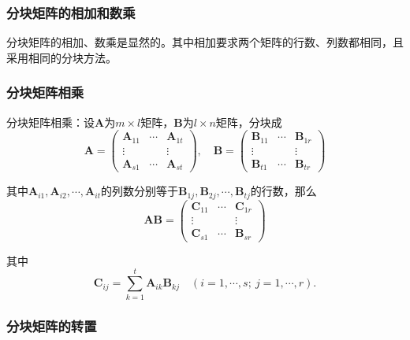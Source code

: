 \documentclass[12pt, a4paper, oneside]{ctexart}
\begin{document}
\subsubsection{分块矩阵的相加和数乘}

分块矩阵的相加、数乘是显然的。其中相加要求两个矩阵的行数、列数都相同，且采用相同的分块方法。

\subsubsection{分块矩阵相乘}

分块矩阵相乘：设$\mathbf{A}$为$m\times l$矩阵，$\mathbf{B}$为$l\times n$矩阵，分块成
\begin{equation*}
  \mathbf{A}=\begin{pmatrix}
    \mathbf{A}_{11} & \cdots & \mathbf{A}_{1t} \\
    \vdots & & \vdots \\
    \mathbf{A}_{s1} & \cdots & \mathbf{A}_{st}
  \end{pmatrix},\quad
  \mathbf{B}=\begin{pmatrix}
    \mathbf{B}_{11} & \cdots & \mathbf{B}_{1r} \\
    \vdots & & \vdots \\
    \mathbf{B}_{t1} & \cdots & \mathbf{B}_{tr}
  \end{pmatrix}
\end{equation*}

其中$\mathbf{A}_{i1},\mathbf{A}_{i2},\cdots,\mathbf{A}_{it}$的列数分别等于$\mathbf{B}_{1j},\mathbf{B}_{2j},\cdots,\mathbf{B}_{tj}$的行数，那么
\begin{equation*}
  \mathbf{AB}=\begin{pmatrix}
    \mathbf{C}_{11} & \cdots & \mathbf{C}_{1r} \\
    \vdots & & \vdots \\
    \mathbf{C}_{s1} & \cdots & \mathbf{B}_{sr}
  \end{pmatrix}
\end{equation*}

其中
\begin{equation*}
  \mathbf{C}_{ij}=\sum_{k=1}^t \mathbf{A}_{ik} \mathbf{B}_{kj}\quad (i=1,\cdots,s;\ j=1,\cdots,r).
\end{equation*}

\subsubsection{分块矩阵的转置}
\end{document}
